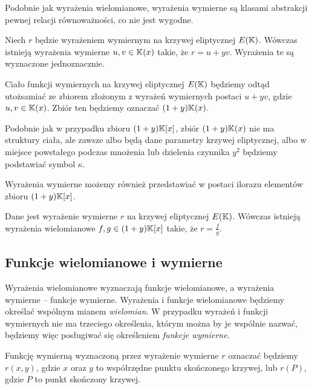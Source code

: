 Podobnie jak wyrażenia wielomianowe,
wyrażenia wymierne są klasami abstrakcji pewnej relacji równoważności,
co nie jest wygodne.

\begin{theorem}
Niech $r$ będzie wyrażeniem wymiernym na krzywej eliptycznej $E(\mathbb{K})$.
Wówczas istnieją wyrażenia wymierne $u, v \in \mathbb{K}(x)$ takie,
że $r = u + yv$.
Wyrażenia te są wyznaczone jednoznacznie.
\end{theorem}

\begin{remark}
Ciało funkcji wymiernych na krzywej eliptycznej $E(\mathbb{K})$
będziemy odtąd utożsamiać ze zbiorem
złożonym z wyrażeń wymiernych postaci $u + yv$,
gdzie $u,v \in \mathbb{K}(x)$.
Zbiór ten będziemy oznaczać $(1 + y)\mathbb{K}(x)$.
\end{remark}

Podobnie jak w przypadku zbioru $(1 + y)\mathbb{K}[x]$,
zbiór $(1 + y)\mathbb{K}(x)$ nie ma struktury ciała,
ale zawsze albo będą dane parametry krzywej eliptycznej,
albo w miejsce powstałego podczas mnożenia lub dzielenia czynnika $y^2$
będziemy podstawiać symbol $\kappa$.

Wyrażenia wymierne możemy również przedstawiać w postaci ilorazu
elementów zbioru $(1 + y)\mathbb{K}[x]$.

\begin{theorem}
Dane jest wyrażenie wymierne $r$ na krzywej eliptycznej $E(\mathbb{K})$.
Wówczas istnieją wyrażenia wielomianowe $f, g \in (1 + y)\mathbb{K}[x]$ takie,
że $r = \frac{f}{g}$.
\end{theorem}

\subsection*{Funkcje wielomianowe i wymierne}

Wyrażenia wielomianowe wyznaczają funkcje wielomianowe,
a wyrażenia wymierne -- funkcje wymierne.
Wyrażenia i funkcje wielomianowe będziemy określać
wspólnym mianem \emph{wielomian}.
W przypadku wyrażeń i funkcji wymiernych nie ma trzeciego określenia,
którym można by je wspólnie nazwać,
będziemy więc posługiwać się określeniem \emph{funkcje wymierne}.

\begin{remark}
Funkcję wymierną wyznaczoną przez wyrażenie wymierne $r$
oznaczać będziemy $r(x, y)$,
gdzie $x$ oraz $y$ to współrzędne punktu skończonego krzywej,
lub $r(P)$, gdzie $P$ to punkt skończony krzywej.
\end{remark}


